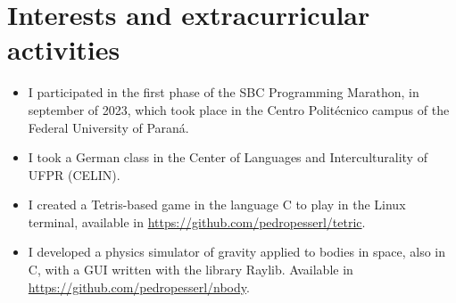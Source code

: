 \documentclass[a4paper, 12pt]{moderncv}
\begin{document}
\section{Interests and extracurricular activities}
\vspace{4pt}
\begin{itemize}
    \item{I participated in the first phase of the SBC Programming Marathon, in
        september of 2023, which took place in the Centro Politécnico campus of
    the Federal University of Paraná.}
    \vspace{4pt}
    \item{I took a German class in the Center of Languages and Interculturality of
        UFPR (CELIN).}
    \vspace{4pt}
    \item{I created a Tetris-based game in the language C to play in the Linux
        terminal, available in \url{https://github.com/pedropesserl/tetric}.}
    \vspace{4pt}
    \item{I developed a physics simulator of gravity applied to bodies in
        space, also in C, with a GUI written with the library Raylib. Available
    in \url{https://github.com/pedropesserl/nbody}.}
\end{itemize}
\end{document}
